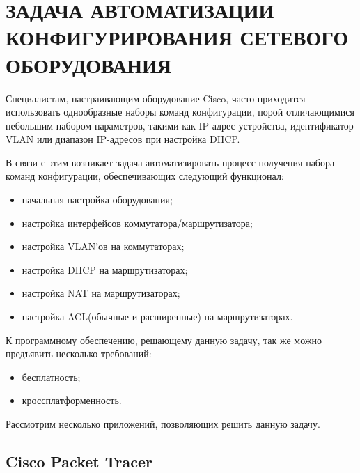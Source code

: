 	\chapter{ЗАДАЧА АВТОМАТИЗАЦИИ КОНФИГУРИРОВАНИЯ СЕТЕВОГО ОБОРУДОВАНИЯ}
	
	Специалистам, настраивающим оборудование Cisco, часто приходится использовать однообразные наборы команд конфигурации, порой отличающимися небольшим набором параметров, такими как IP-адрес устройства, идентификатор VLAN или диапазон IP-адресов при настройка DHCP.
	
	В связи с этим возникает задача автоматизировать процесс получения набора команд конфигурации, обеспечивающих следующий функционал:
	
	\begin{itemize}
		\item начальная настройка оборудования;
		\item настройка интерфейсов коммутатора/маршрутизатора;
		\item настройка VLAN'ов на коммутаторах;
		\item настройка DHCP на маршрутизаторах;
		\item настройка NAT на маршрутизаторах;
		\item настройка ACL(обычные и расширенные) на маршрутизаторах.
	\end{itemize}
	
	К программному обеспечению, решающему данную задачу, так же можно предъявить несколько требований:
	
	\begin{itemize}
		\item бесплатность;
		\item кроссплатформенность.
	\end{itemize} 
	
	Рассмотрим несколько приложений, позволяющих решить данную задачу.
%	
%	
%	
	
	\section{Cisco Packet Tracer}
	
